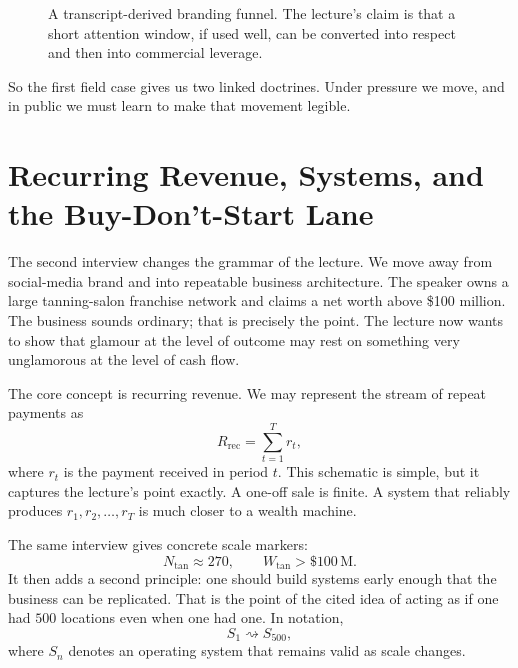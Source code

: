 \begin{figure}[h]
\centering
{}
\caption{A transcript-derived branding funnel. The lecture's claim is that a short attention window, if used well, can be converted into respect and then into commercial leverage.}
\end{figure}

So the first field case gives us two linked doctrines. Under pressure we move, and in public we must learn to make that movement legible.

\section{Recurring Revenue, Systems, and the Buy-Don't-Start Lane}

The second interview changes the grammar of the lecture. We move away from social-media brand and into repeatable business architecture. The speaker owns a large tanning-salon franchise network and claims a net worth above \$100 million. The business sounds ordinary; that is precisely the point. The lecture now wants to show that glamour at the level of outcome may rest on something very unglamorous at the level of cash flow.

The core concept is recurring revenue. We may represent the stream of repeat payments as
\begin{equation}
R_{\mathrm{rec}} = \sum_{t=1}^{T} r_t,
\end{equation}
where \(r_t\) is the payment received in period \(t\). This schematic is simple, but it captures the lecture's point exactly. A one-off sale is finite. A system that reliably produces \(r_1,r_2,\dots,r_T\) is much closer to a wealth machine.

The same interview gives concrete scale markers:
\begin{equation}
N_{\mathrm{tan}} \approx 270,
\qquad
W_{\mathrm{tan}} > \$100\,\mathrm{M}.
\end{equation}
It then adds a second principle: one should build systems early enough that the business can be replicated. That is the point of the cited idea of acting as if one had \(500\) locations even when one had one. In notation,
\begin{equation}
S_1 \rightsquigarrow S_{500},
\end{equation}
where \(S_n\) denotes an operating system that remains valid as scale changes.

